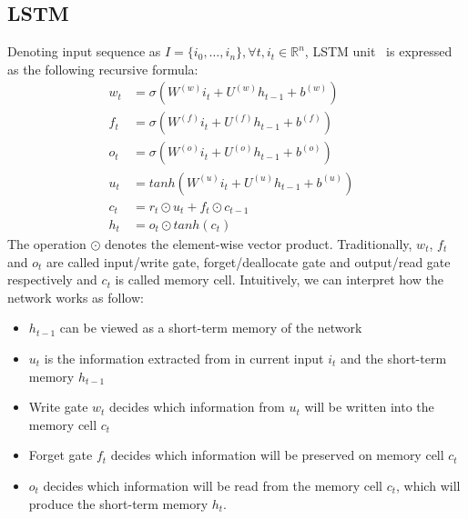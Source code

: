 \subsection{LSTM}\label{sec:lstm}
Denoting input sequence as \(I = \{i_0,\ldots,i_n\}, \forall t, i_t \in \mathbb{R}^n\), LSTM unit~\cite{originLSTM} is expressed as the following recursive formula:
\begin{align}
w_t &= \sigma\left(W^{(w)}i_t + U^{(w)}h_{t-1} + b^{(w)}\right) \label{eq:lstm-input-gate}&\\
f_t &= \sigma\left(W^{(f)}i_t + U^{(f)}h_{t-1} + b^{(f)}\right) \label{eq:lstm-forget-gate}&\\
o_t &= \sigma\left(W^{(o)}i_t + U^{(o)}h_{t-1} + b^{(o)}\right) \label{eq:lstm-output-gate}&\\
u_t &= tanh\left(W^{(u)}i_t + U^{(u)}h_{t-1} + b^{(u)}\right) \label{eq:lstm-update-gate}&\\
c_t &= r_t \odot u_t + f_t \odot c_{t-1} \label{eq:longterm-mem}&\\
h_t &= o_t \odot tanh(c_t) \label{eq:temperal-mem}&
\end{align}
The operation \(\odot\) denotes the element-wise vector product.
Traditionally, \(w_t\), \(f_t\) and \(o_t\) are called input/write gate, forget/deallocate gate and output/read gate respectively and \(c_t\) is called memory cell.
Intuitively, we can interpret how the network works as follow:
\begin{itemize}
  \item \(h_{t-1}\) can be viewed as a short-term memory of the network
  \item \(u_t\) is the information extracted from in current input \(i_t\) and the short-term memory \(h_{t-1}\)
  \item Write gate \(w_t\) decides which information from \(u_t\) will be written into the memory cell \(c_t\)
  \item Forget gate \(f_t\) decides which information will be preserved on memory cell \(c_t\)
  \item \(o_t\) decides which information will be read from the memory cell \(c_t\), which will produce the short-term memory \(h_t\).
\end{itemize}

